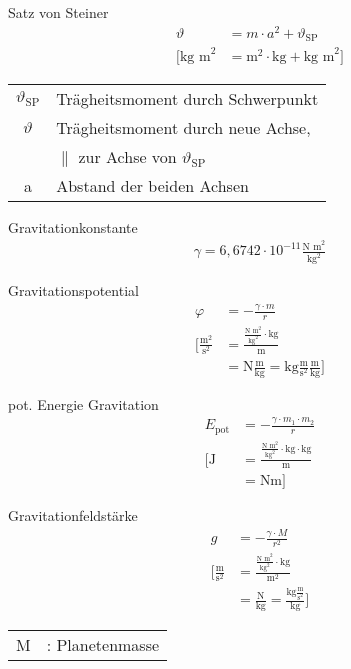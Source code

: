 \begin{karte}{Satz von Steiner}
    \begin{align*}
        \vartheta &= m \cdot a^2 + \vartheta_{\text{SP}} \\
        \bigg[ \text{kg m}^2 &=
            \text{m}^2 \cdot \text{kg} + \text{kg m}^2
            \bigg]
    \end{align*}
    \begin{tabular}[t]{cl}
        \(\vartheta_\text{SP}\) & Trägheitsmoment durch Schwerpunkt \\
        \(\vartheta\) & Trägheitsmoment durch neue Achse, \\
        &\(\parallel\) zur Achse von \(\vartheta_\text{SP}\) \\
        a & Abstand der beiden Achsen
    \end{tabular}
\end{karte}

\begin{karte}{Gravitationkonstante}
    \begin{align*}
        \gamma = 6,6742 \cdot 10^{-11} \frac{\text{N m}^2}{\text{kg}^2}
    \end{align*}
\end{karte}

\begin{karte}{Gravitationspotential}
    \begin{align*}
        \varphi &= - \frac{\gamma \cdot m }{r} \\
        \bigg[ \frac{\text{m}^2}{\text{s}^2} &= \frac{\frac{\text{N m}^2}{\text{kg}^2} \cdot \text{kg}}{\text{m}} \\
            &= \text{N}\frac{\text{m}}{\text{kg}} = \text{kg}\frac{\text{m}}{\text{s}^2}\frac{\text{m}}{\text{kg}} 
            \bigg]
    \end{align*}
\end{karte}

\begin{karte}{pot. Energie Gravitation}
    \begin{align*}
        E_\text{pot} &= - \frac{\gamma \cdot m_1 \cdot m_2}{r}\\
        \bigg[ \text{J} &= \frac{\frac{\text{N m}^2}{\text{kg}^2} \cdot \text{kg} \cdot \text{kg}}{\text{m}} \\
            &= \text{Nm} \bigg]
    \end{align*}
\end{karte}

\begin{karte}{Gravitationfeldstärke}
    \begin{align*}
        g &= - \frac{ \gamma \cdot M }{r^2} \\
        \bigg[ \frac{\text{m}}{\text{s}^2} &= \frac{\frac{\text{N m}^2}{\text{kg}^2} \cdot \text{kg}}{\text{m}^2} \\
            &= \frac{\text{N}}{\text{kg}} = \frac{\text{kg}\frac{\text{m}}{\text{s}^2}}{\text{kg}}
            \bigg]
    \end{align*}
    \begin{tabular}[t]{cl}
        M &: Planetenmasse
    \end{tabular}
\end{karte}

